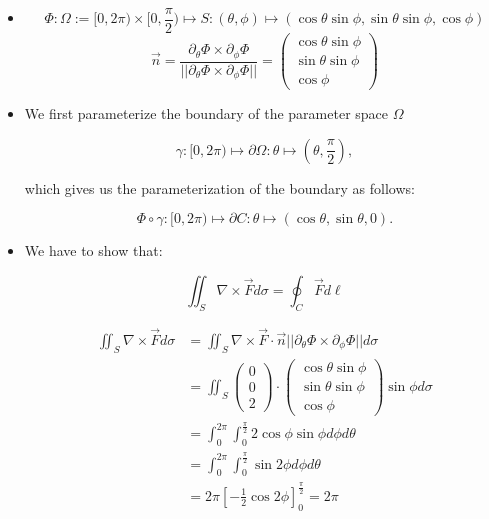 \documentclass[11pt]{article}
\begin{document}
\begin{solution}     
    \begin{itemize}
    \item $$\Phi: \Omega:= [0,2\pi)\times[0,\frac{\pi}{2}) \mapsto S: (\theta,\phi)\mapsto (\cos\theta\sin\phi,\sin\theta\sin\phi,\cos\phi) $$
			$$\vec{n} = \frac{\partial_{\theta}\Phi\times \partial_{\phi}\Phi}{||\partial_{\theta}\Phi\times \partial_{\phi}\Phi||} = \begin{pmatrix}\cos\theta\sin\phi \\ \sin\theta\sin\phi\\ \cos\phi\end{pmatrix}$$

    \item We first parameterize the boundary of the parameter space $\Omega$ 

$$\gamma:[0,2\pi) \mapsto \partial \Omega : \theta \mapsto(\theta, \frac{\pi}{2}),$$
			
which gives us the parameterization of the boundary as follows:

$$\Phi\circ \gamma:[0,2\pi) \mapsto \partial C : \theta \mapsto(\cos\theta,\sin\theta,0).$$

    \item 
        We have to show that:

$$
\iint_S \nabla \times \vec{F} d\sigma = \oint_C \vec{F} d\ell
$$

     \begin{align*}
\iint_S \nabla \times \vec{F} d\sigma &= \iint_S \nabla \times \vec{F}\cdot \vec{n}||\partial_{\theta}\Phi\times \partial_{\phi}\Phi|| d\sigma\\
 &= \iint_S \begin{pmatrix} 0\\ 0\\ 2 \end{pmatrix}\cdot \begin{pmatrix}\cos\theta\sin\phi \\ \sin\theta\sin\phi\\ \cos\phi\end{pmatrix}\sin\phi d\sigma\\
&= \int_0^{2\pi}\int_0^{\frac{\pi}{2}} 2\cos\phi\sin\phi d\phi d\theta\\
&= \int_0^{2\pi}\int_0^{\frac{\pi}{2}} \sin2\phi d\phi d\theta\\
&= 2\pi \left[ -\frac{1}{2}\cos2\phi \right]_0^{\frac{\pi}{2}} = 2\pi\\
     \end{align*}   


\end{itemize}
\end{solution}
\end{document}
